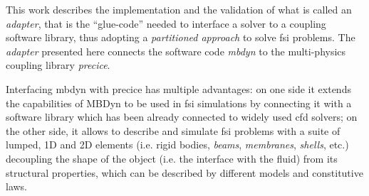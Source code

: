 This work describes the implementation and the validation of what is called an \textit{adapter}, that is the ``glue-code'' needed to interface a solver to a coupling software library, thus adopting a \textit{partitioned approach} to solve \acrshort{fsi} problems. The \textit{adapter} presented here connects the software code \textit{\acrfull{mbdyn}}  to the multi-physics coupling library \textit{\acrfull{precice}}.

Interfacing \acrshort{mbdyn} with \acrshort{precice} has multiple advantages: on one side it extends the capabilities of MBDyn to be used in \acrshort{fsi} simulations by connecting it with a software library which has been already connected to widely used \acrshort{cfd} solvers; on the other side, it allows to describe and simulate \acrshort{fsi} problems with a suite of lumped, 1D and 2D elements (i.e. rigid bodies, \textit{beams}, \textit{membranes}, \textit{shells}, etc.) decoupling the shape of the object (i.e. the interface with the fluid) from its structural properties, which can be described by different models and constitutive laws.  


